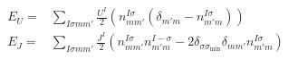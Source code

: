 \documentclass[xcolor=table,aspectratio=169]{beamer}
\numberwithin{equation}{section}
\begin{document}
% 
\begin{frame}
    \begin{align}
        E_{U} = & \sum_{I\sigma m m'} \frac{U^I}{2} \left(n^{I\sigma}_{mm'} (\delta_{m'm} - n^{I\sigma}_{m'm})\right) \label{eqn:u_correction}                              \\
        E_{J} = & \sum_{I\sigma m m'} \frac{J^I}{2} \left( n^{I\sigma}_{mm'} n^{I-\sigma}_{m'm} - 2\delta_{\sigma \sigma_\mathrm{min}}\delta_{mm'} n^{I\sigma}_{m'm}\right)
        \label{eqn:j_correction}
    \end{align}
\end{frame}
% 
\end{document}
